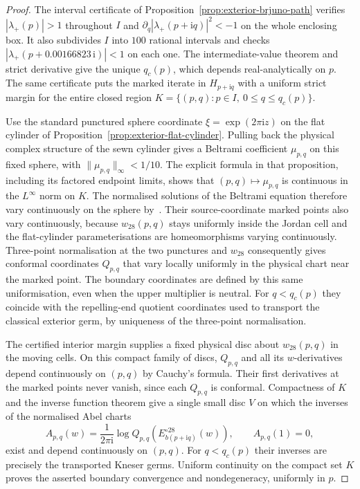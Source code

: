 \documentclass[11pt]{amsart}
\theoremstyle{definition}
\newcommand{\ii}{\mathrm{i}}
\begin{document}
\begin{proof}
The interval certificate of
Proposition~\ref{prop:exterior-brjuno-path} verifies
$|\lambda_+(p)|>1$ throughout $I$ and
$\partial_q|\lambda_+(p+\ii q)|^2<-1$ on the whole enclosing box.
It also subdivides $I$ into $100$ rational intervals and checks
$|\lambda_+(p+0.00166823\,\ii)|<1$ on each one.
The intermediate-value theorem and strict derivative give the
unique $q_c(p)$, which depends real-analytically on $p$.
The same certificate puts the marked iterate in $H_{p+\ii q}$
with a uniform strict margin for the entire closed region
$K=\{(p,q):p\in I,\ 0\le q\le q_c(p)\}$.

Use the standard punctured sphere coordinate
$\xi=\exp(2\pi\ii z)$ on the flat cylinder of
Proposition~\ref{prop:exterior-flat-cylinder}.  Pulling back the
physical complex structure of the sewn cylinder gives a Beltrami
coefficient $\mu_{p,q}$ on this fixed sphere, with
$\|\mu_{p,q}\|_\infty<1/10$.  The explicit formula in that
proposition, including its factored endpoint limits, shows that
$(p,q)\mapsto\mu_{p,q}$ is continuous in the $L^\infty$ norm on
$K$.  The normalised solutions of the Beltrami equation therefore
vary continuously on the sphere by~\cite[Thm.~8]{AhlforsBers1960}.
Their source-coordinate marked points also vary continuously,
because $w_{28}(p,q)$ stays uniformly inside the Jordan cell and the
flat-cylinder parameterisations are homeomorphisms varying
continuously.  Three-point normalisation at the two punctures and
$w_{28}$ consequently gives conformal coordinates $Q_{p,q}$ that
vary locally uniformly in the physical chart near the marked point.
The boundary coordinates are defined by this same uniformisation,
even when the upper multiplier is neutral.  For $q<q_c(p)$ they
coincide with the repelling-end quotient coordinates used to
transport the classical exterior germ, by uniqueness of the
three-point normalisation.

The certified interior margin supplies a fixed physical disc about
$w_{28}(p,q)$ in the moving cells.  On this compact family of discs,
$Q_{p,q}$ and all its $w$-derivatives depend continuously on
$(p,q)$ by Cauchy's formula.  Their first derivatives at the marked
points never vanish, since each $Q_{p,q}$ is conformal.
Compactness of $K$ and the inverse function theorem give a single
small disc $V$ on which the inverses of the normalised Abel charts
\[
 A_{p,q}(w)=\frac{1}{2\pi\ii}
       \log Q_{p,q}(E_{b(p+\ii q)}^{\circ28}(w)),
 \qquad A_{p,q}(1)=0,
\]
exist and depend continuously on $(p,q)$.  For $q<q_c(p)$ their
inverses are precisely the transported Kneser germs.  Uniform
continuity on the compact set $K$ proves the asserted boundary
convergence and nondegeneracy, uniformly in $p$.
\end{proof}
\end{document}
